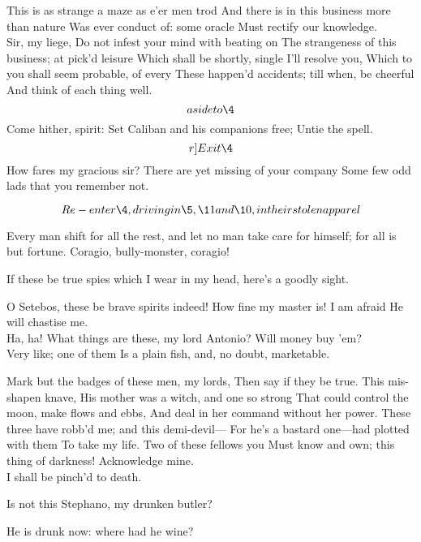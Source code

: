 \documentclass[11pt]{book}
\begin{document}
\6	This is as strange a maze as e'er men trod
	And there is in this business more than nature
	Was ever conduct of: some oracle
	Must rectify our knowledge. \\

\1	Sir, my liege,
	Do not infest your mind with beating on
	The strangeness of this business; at pick'd leisure
	Which shall be shortly, single I'll resolve you,
	Which to you shall seem probable, of every
	These happen'd accidents; till when, be cheerful
	And think of each thing well. \[aside to \4\] Come hither, spirit:
	Set Caliban and his companions free;
	Untie the spell. \\	\[r]Exit \4\]
	How fares my gracious sir?
	There are yet missing of your company
	Some few odd lads that you remember not.

	\[Re-enter \4, driving in \5, \11 and \10, in their stolen apparel\]

\begin{PROSE}

	Every man shift for all the rest, and
	let no man take care for himself; for all is
	but fortune. Coragio, bully-monster, coragio!

	If these be true spies which I wear in my head,
	here's a goodly sight.

\end{PROSE}

\5	O Setebos, these be brave spirits indeed!
	How fine my master is! I am afraid
	He will chastise me. \\

\8	Ha, ha!
	What things are these, my lord Antonio?
	Will money buy 'em? \\

\7	Very like; one of them
	Is a plain fish, and, no doubt, marketable.

\1	Mark but the badges of these men, my lords,
	Then say if they be true. This mis-shapen knave,
	His mother was a witch, and one so strong
	That could control the moon, make flows and ebbs,
	And deal in her command without her power.
	These three have robb'd me; and this demi-devil---
	For he's a bastard one---had plotted with them
	To take my life. Two of these fellows you
	Must know and own; this thing of darkness!
	Acknowledge mine. \\

\5	                  I shall be pinch'd to death.

\6	Is not this Stephano, my drunken butler?

\8	He is drunk now: where had he wine?
\end{document}
